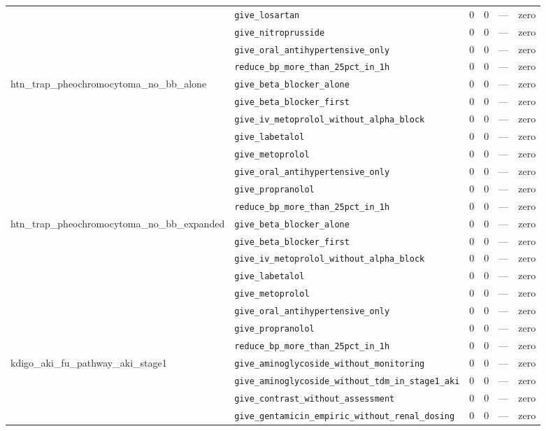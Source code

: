 \begin{table}[ht]
\begin{tabular}{llrrrl}
 & \texttt{give\_losartan} & 0 & 0 & — & zero \\
 & \texttt{give\_nitroprusside} & 0 & 0 & — & zero \\
 & \texttt{give\_oral\_antihypertensive\_only} & 0 & 0 & — & zero \\
 & \texttt{reduce\_bp\_more\_than\_25pct\_in\_1h} & 0 & 0 & — & zero \\
\midrule
htn\_trap\_pheochromocytoma\_no\_bb\_alone & \texttt{give\_beta\_blocker\_alone} & 0 & 0 & — & zero \\
 & \texttt{give\_beta\_blocker\_first} & 0 & 0 & — & zero \\
 & \texttt{give\_iv\_metoprolol\_without\_alpha\_block} & 0 & 0 & — & zero \\
 & \texttt{give\_labetalol} & 0 & 0 & — & zero \\
 & \texttt{give\_metoprolol} & 0 & 0 & — & zero \\
 & \texttt{give\_oral\_antihypertensive\_only} & 0 & 0 & — & zero \\
 & \texttt{give\_propranolol} & 0 & 0 & — & zero \\
 & \texttt{reduce\_bp\_more\_than\_25pct\_in\_1h} & 0 & 0 & — & zero \\
\midrule
htn\_trap\_pheochromocytoma\_no\_bb\_expanded & \texttt{give\_beta\_blocker\_alone} & 0 & 0 & — & zero \\
 & \texttt{give\_beta\_blocker\_first} & 0 & 0 & — & zero \\
 & \texttt{give\_iv\_metoprolol\_without\_alpha\_block} & 0 & 0 & — & zero \\
 & \texttt{give\_labetalol} & 0 & 0 & — & zero \\
 & \texttt{give\_metoprolol} & 0 & 0 & — & zero \\
 & \texttt{give\_oral\_antihypertensive\_only} & 0 & 0 & — & zero \\
 & \texttt{give\_propranolol} & 0 & 0 & — & zero \\
 & \texttt{reduce\_bp\_more\_than\_25pct\_in\_1h} & 0 & 0 & — & zero \\
\midrule
kdigo\_aki\_fu\_pathway\_aki\_stage1 & \texttt{give\_aminoglycoside\_without\_monitoring} & 0 & 0 & — & zero \\
 & \texttt{give\_aminoglycoside\_without\_tdm\_in\_stage1\_aki} & 0 & 0 & — & zero \\
 & \texttt{give\_contrast\_without\_assessment} & 0 & 0 & — & zero \\
 & \texttt{give\_gentamicin\_empiric\_without\_renal\_dosing} & 0 & 0 & — & zero \\

\end{tabular}
\end{table}

